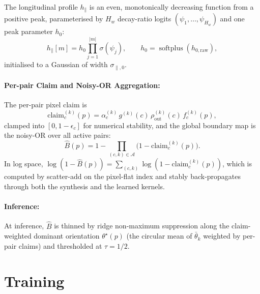 \documentclass[11pt,a4paper]{article}
\newcommand{\abs}[1]{\left\lvert#1\right\rvert}
\newcommand{\softplus}{\operatorname{softplus}}
\begin{document}
The longitudinal profile $h_{\parallel}$ is an even, monotonically decreasing function from a positive peak, parameterised by $H_w$ decay-ratio logits $(\psi_1, \dots, \psi_{H_w})$ and one peak parameter $h_0$:
\begin{equation}\label{eq:h-par}
  h_{\parallel}[m] = h_0 \prod_{j=1}^{\abs{m}} \sigma(\psi_j),
  \qquad h_0 = \softplus(h_{0,\mathrm{raw}}),
\end{equation}
initialised to a Gaussian of width $\sigma_{\parallel,0}$.

\paragraph{Per-pair Claim and Noisy-OR Aggregation:}
The per-pair pixel claim is
\begin{equation}\label{eq:claim}
  \mathrm{claim}^{(k)}_c(p) = \alpha^{(k)}_c\, g^{(k)}(c)\, \rho_{\mathrm{out}}^{(k)}(c)\, f^{(k)}_c(p),
\end{equation}
clamped into $[0, 1-\epsilon_c]$ for numerical stability, and the global boundary map is the noisy-OR over all active pairs:
\begin{equation}\label{eq:noisy-or}
  \boxed{\;
  \hat B(p) = 1 - \prod_{(c, k)\in\mathcal{A}} \bigl(1 - \mathrm{claim}^{(k)}_c(p)\bigr).\;}
\end{equation}
In log space, $\log(1 - \hat B(p)) = \sum_{(c, k)} \log(1 - \mathrm{claim}^{(k)}_c(p))$, which is computed by scatter-add on the pixel-flat index and stably back-propagates through both the synthesis and the learned kernels.

\paragraph{Inference:}
At inference, $\hat B$ is thinned by ridge non-maximum suppression along the claim-weighted dominant orientation $\theta^\star(p)$ (the circular mean of $\bar\theta_k$ weighted by per-pair claims) and thresholded at $\tau = 1/2$.

\section{Training}\label{sec:train}
\end{document}

